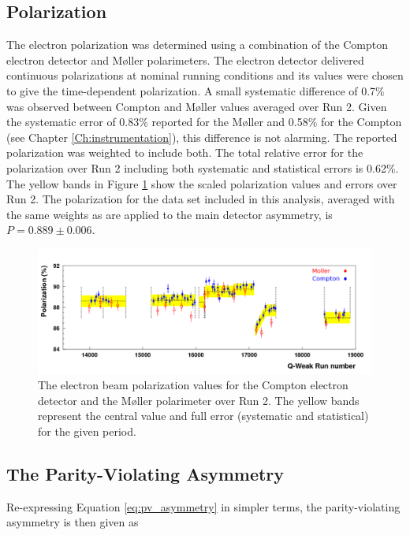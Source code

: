 \subsection{Polarization}
The electron polarization was determined using a combination of the Compton electron detector and M\o ller polarimeters. The electron detector delivered continuous polarizations at nominal running conditions and its values were chosen to give the time-dependent polarization. A small systematic difference of 0.7\% was observed between Compton and M\o ller values averaged over Run 2. Given the systematic error of 0.83\% reported for the M\o ller and 0.58\% for the Compton (see Chapter \ref{Ch:instrumentation}), this difference is not alarming. The reported polarization was weighted to include both. The total relative error for the polarization over Run 2 including both systematic and statistical errors is 0.62\%. The yellow bands in Figure \ref{fig:run2_epol} show the scaled polarization values and errors over Run 2. The polarization for the data set included in this analysis, averaged with the same weights as are applied to the main detector asymmetry, is $P=0.889\pm0.006$.
\begin{figure}[!h]
\begin{center}
\includegraphics[width=5.9in]{./Pictures/qweak_run2_polarization_v2.png}
\caption{\label{fig:run2_epol}The electron beam polarization values for the Compton electron detector and the M\o ller polarimeter over Run 2. The yellow bands represent the central value and full error (systematic and statistical) for the given period.}
\end{center}
\end{figure}

\subsection{The Parity-Violating Asymmetry}
Re-expressing Equation \ref{eq:pv_asymmetry} in simpler terms, the parity-violating asymmetry is then given as

